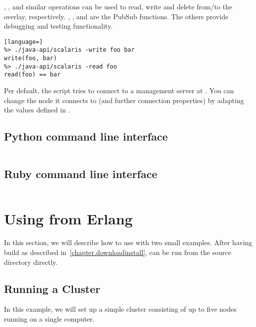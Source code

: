 , ,  and similar operations can be used to read, write
and delete from/to the overlay, respectively. ,
, and  are the PubSub functions. The others
provide debugging and testing functionality.

\begin{lstlisting}[language=]
%> ./java-api/scalaris -write foo bar
write(foo, bar)
%> ./java-api/scalaris -read foo
read(foo) == bar
\end{lstlisting}

Per default, the  script tries to connect to a management
server at . You can change the node it connects to (and
further connection properties) by adapting the values defined in
.

\subsection{Python command line interface}

\begin{lstlisting}[language=sh]
%> ./python-api/scalaris_client.py --help
\end{lstlisting}


\subsection{Ruby command line interface}

\begin{lstlisting}[language=sh]
%> ../ruby-api/scalaris_client.rb --help
\end{lstlisting}


\section{Using \scalaris{} from Erlang}
\label{chapter.systemuse.usingfromerl}

In this section, we will describe how to use \scalaris{} with two small
examples. After having build \scalaris{} as described
in~\ref{chapter.downloadinstall}, \scalaris{} can be run from the source
directory directly.

\subsection{Running a \scalaris{} Cluster}
In this example, we will set up a simple \scalaris{} cluster consisting of
up to five nodes running on a single computer.

